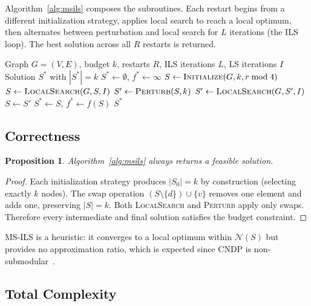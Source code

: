 \documentclass[11pt,a4paper]{article}
\newtheorem{proposition}{Proposition}
\begin{document}
Algorithm~\ref{alg:msils} composes the subroutines. Each restart begins from a different initialization strategy, applies local search to reach a local optimum, then alternates between perturbation and local search for $L$ iterations (the ILS loop). The best solution across all $R$ restarts is returned.

\begin{algorithm}[ht]
\caption{MS-ILS$(G, k, R, L, I)$}
\label{alg:msils}
\begin{algorithmic}[1]
\Require Graph $G=(V,E)$, budget $k$, restarts $R$, ILS iterations $L$, LS iterations $I$
\Ensure Solution $S^*$ with $|S^*| = k$
\State $S^* \gets \emptyset$, $f^* \gets \infty$
    \State $S \gets \textsc{Initialize}(G, k, r \bmod 4)$
    \State $S \gets \textsc{LocalSearch}(G, S, I)$
        \State $S' \gets \textsc{Perturb}(S, k)$
        \State $S' \gets \textsc{LocalSearch}(G, S', I)$
            \State $S \gets S'$
        \EndIf
    \EndFor
        \State $S^* \gets S$, $f^* \gets f(S)$
    \EndIf
\EndFor
\State \Return $S^*$
\end{algorithmic}
\end{algorithm}

\subsection{Correctness}

\begin{proposition}
Algorithm~\ref{alg:msils} always returns a feasible solution.
\end{proposition}
\begin{proof}
Each initialization strategy produces $|S_0| = k$ by construction (selecting exactly $k$ nodes). The swap operation $(S \setminus \{d\}) \cup \{v\}$ removes one element and adds one, preserving $|S| = k$. Both \textsc{LocalSearch} and \textsc{Perturb} apply only swaps. Therefore every intermediate and final solution satisfies the budget constraint.
\end{proof}

MS-ILS is a heuristic: it converges to a local optimum within $\mathcal{N}(S)$ but provides no approximation ratio, which is expected since CNDP is non-submodular~\cite{nemhauser1978}.

\subsection{Total Complexity}
\end{document}
